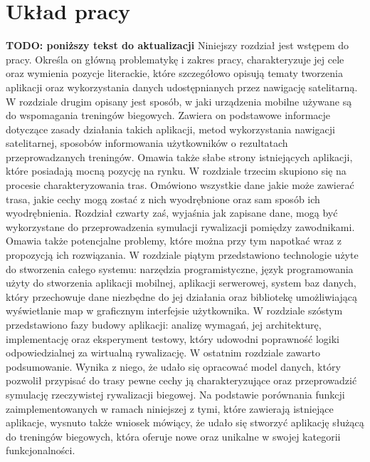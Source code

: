 \section{Układ pracy}
\textbf{TODO: poniższy tekst do aktualizacji}
Niniejszy rozdział jest wstępem do pracy. Określa on główną problematykę i zakres pracy, charakteryzuje jej cele oraz wymienia pozycje literackie, które szczegółowo opisują tematy tworzenia aplikacji oraz wykorzystania danych udostępnianych przez nawigację satelitarną. W rozdziale drugim opisany jest sposób, w jaki urządzenia mobilne używane są do wspomagania treningów biegowych. Zawiera on podstawowe informacje dotyczące zasady działania takich aplikacji, metod wykorzystania nawigacji satelitarnej, sposobów informowania użytkowników o rezultatach przeprowadzanych treningów. Omawia także słabe strony istniejących aplikacji, które posiadają mocną pozycję na rynku. W rozdziale trzecim skupiono się na procesie charakteryzowania tras. Omówiono wszystkie dane jakie może zawierać trasa, jakie cechy mogą zostać z nich wyodrębnione oraz sam sposób ich wyodrębnienia. Rozdział czwarty zaś, wyjaśnia jak zapisane dane, mogą być wykorzystane do przeprowadzenia symulacji rywalizacji pomiędzy zawodnikami. Omawia także potencjalne problemy, które można przy tym napotkać wraz z propozycją ich rozwiązania. W rozdziale piątym przedstawiono technologie użyte do stworzenia całego systemu: narzędzia programistyczne, język programowania użyty do stworzenia aplikacji mobilnej, aplikacji serwerowej, system baz danych, który przechowuje dane niezbędne do jej działania oraz bibliotekę umożliwiającą wyświetlanie map w graficznym interfejsie użytkownika. W rozdziale szóstym przedstawiono fazy budowy aplikacji: analizę wymagań, jej architekturę, implementację oraz eksperyment testowy, który udowodni poprawność logiki odpowiedzialnej za wirtualną rywalizację. W ostatnim rozdziale zawarto podsumowanie. Wynika z niego, że udało się opracować model danych, który pozwolił przypisać do trasy pewne cechy ją charakteryzujące oraz przeprowadzić symulację rzeczywistej rywalizacji biegowej. Na podstawie porównania funkcji zaimplementowanych w ramach niniejszej z tymi, które zawierają istniejące aplikacje, wysnuto także wniosek mówiący, że udało się stworzyć aplikację służącą do treningów biegowych, która oferuje nowe oraz unikalne w swojej kategorii funkcjonalności.
